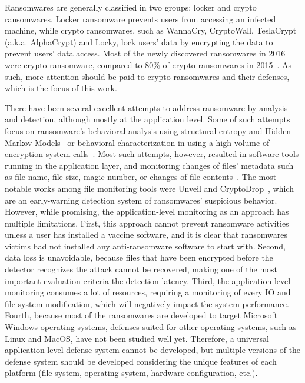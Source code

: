 \documentclass[conference]{IEEEtran}
\begin{document}
Ransomwares are generally classified in two groups: locker and
crypto ransomwares.  Locker ransomware prevents users from
accessing an infected machine, while crypto ransomwares, such as
WannaCry, CryptoWall, TeslaCrypt (a.k.a. AlphaCrypt) and Locky, lock
users' data by encrypting the data to prevent users' data access. 
Most of the newly discovered ransomwares in 2016 were crypto ransomware, compared to 80\% of crypto
ransomwares in 2015~\cite{symantec16}.  As such, more attention should be paid to crypto ransomwares and their defenses, which is the focus of this work.

There have been several excellent  attempts to address ransomware by analysis and detection, although mostly at the application level.  Some of such attempts focus on
ransomware's behavioral analysis using structural entropy and Hidden Markov
Models~\cite{canfora16} or behavioral characterization in using a high volume of encryption
system calls~\cite{andronio15}.  Most  such attempts, however, resulted in
software tools running in the application layer, and monitoring changes
of files' metadata such as file name, file size, magic number, or
changes of file contents~\cite{scaife16,andronio15,kim94}.  The
most notable works among file monitoring tools were Unveil and
CryptoDrop~\cite{scaife16,kharaz}, which are an early-warning
detection system of ransomwares' suspicious behavior.  However, while promising, the
application-level monitoring as an approach has multiple limitations. First, this approach cannot
prevent ransomware activities unless a user has installed a vaccine
software, and it is clear that  ransomwares victims  had not installed any anti-ransomware software to start with. Second, data loss is
unavoidable, because files that have been encrypted before the
detector recognizes the attack cannot be recovered, making one of
the most important evaluation criteria the detection latency.  Third, 
the application-level monitoring consumes a lot of resources, requiring a monitoring of every IO and file system modification, which will negatively impact the system performance. Fourth, because most of the ransomwares are developed to target Microsoft
Windows operating systems, defenses suited for other
operating systems, such as Linux and MacOS, have not been studied
well yet.  Therefore, a universal application-level defense
system cannot be developed, but multiple versions of the defense
system should be developed considering the unique features of each
platform (file system, operating system, hardware configuration,
etc.).  
\end{document}
